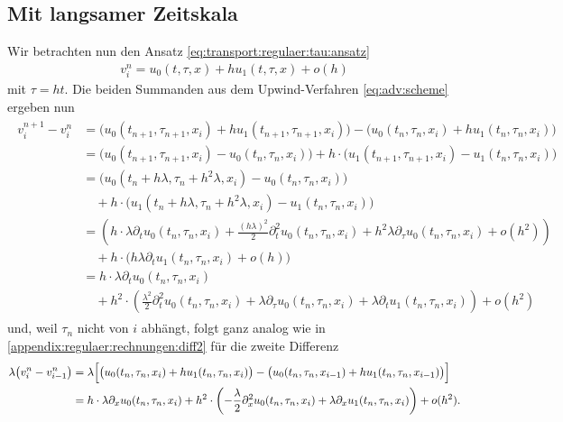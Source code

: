 \subsection*{Mit langsamer Zeitskala}
Wir betrachten nun den Ansatz \eqref{eq:transport:regulaer:tau:ansatz}
\begin{align}
v^n_i = u_0(t, \tau, x) + h u_1(t, \tau, x) + o(h)
\end{align}
mit $\tau = h t.$
Die beiden Summanden aus dem Upwind-Verfahren \eqref{eq:adv:scheme} ergeben nun
{\small \begin{align} \label{eq:appendix:regulaer:tau:diff1}
\begin{split}
v^{n+1}_i - v^n_i &= \bigl( u_0(t_{n+1}, \tau_{n+1}, x_i) + h u_1(t_{n+1}, \tau_{n+1}, x_i)\bigr) - \bigl( u_0(t_n, \tau_n, x_i) + h u_1(t_n, \tau_n, x_i) \bigr)\\
&= \bigl( u_0(t_{n+1}, \tau_{n+1}, x_i) - u_0(t_n, \tau_n, x_i) \bigr) + h \cdot \bigl( u_1(t_{n+1}, \tau_{n+1}, x_i) - u_1(t_n, \tau_n, x_i)\bigr)\\
&= \bigl( u_0(t_n + h \lambda, \tau_n + h^2 \lambda, x_i) - u_0(t_n, \tau_n, x_i) \bigr)\\
&\quad + h \cdot \bigl( u_1(t_n + h \lambda, \tau_n + h^2 \lambda, x_i) - u_1(t_n, \tau_n, x_i)\bigr)\\
&= \left( h \cdot \lambda \partial_t u_0(t_n, \tau_n, x_i) + \frac{(h \lambda)^2}{2} \partial^2_t u_0(t_n, \tau_n, x_i) + h^2 \lambda \partial_\tau u_0(t_n, \tau_n, x_i) + o(h^2) \right)\\
&\quad + h \cdot \Bigr( h \lambda \partial_t u_1(t_n, \tau_n, x_i) + o(h) \Bigr)\\
&= h \cdot \lambda \partial_t u_0(t_n, \tau_n, x_i)\\
&\quad + h^2 \cdot \left( \frac{\lambda^2}{2} \partial^2_t u_0(t_n, \tau_n, x_i) + \lambda \partial_\tau u_0(t_n, \tau_n, x_i) + \lambda \partial_t u_1(t_n, \tau_n, x_i) \right) + o(h^2)
\end{split}
\end{align}}
und, weil $\tau_n$ nicht von $i$ abhängt, folgt ganz analog wie in \eqref{appendix:regulaer:rechnungen:diff2} für die zweite Differenz
{\small \begin{align} \label{eq:appendix:regulaer:tau:diff2}
\begin{split}
\lambda \bigl( v^n_i - v^n_{i-1} \bigr)
&= \lambda \Bigl[ \bigl( u_0(t_n, \tau_n, x_i) + h u_1(t_n, \tau_n,  x_i)\bigr) - \bigl( u_0(t_n, \tau_n, x_{i-1}) + h u_1(t_n, \tau_n, x_{i-1}) \bigr) \Bigr]\\
&= h \cdot \lambda \partial_x u_0(t_n,\tau_n,  x_i) + h^2 \cdot \left( - \frac{\lambda}{2} \partial^2_x u_0(t_n,\tau_n, x_i) + \lambda \partial_x u_1(t_n, \tau_n, x_i) \right) + o(h^2).
\end{split}
\end{align} }
